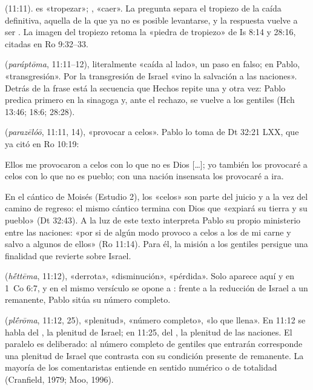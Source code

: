 \textbf{} (11:11).  es «tropezar»; , «caer». La pregunta separa el tropiezo de la caída definitiva, aquella de la que ya no es posible levantarse, y la respuesta vuelve a ser . La imagen del tropiezo retoma la «piedra de tropiezo» de Is 8:14 y 28:16, citadas en Ro 9:32--33.

\textbf{} (\emph{paráptōma}, 11:11--12), literalmente «caída al lado», un paso en falso; en Pablo, «transgresión». Por la transgresión de Israel «vino la salvación a las naciones». Detrás de la frase está la secuencia que Hechos repite una y otra vez: Pablo predica primero en la sinagoga y, ante el rechazo, se vuelve a los gentiles (Hch 13:46; 18:6; 28:28).

\textbf{} (\emph{parazēlóō}, 11:11, 14), «provocar a celos». Pablo lo toma de Dt 32:21 LXX, que ya citó en Ro 10:19:
\begin{cita}Ellos me provocaron a celos con lo que no es Dios [\ldots]; yo también los provocaré a celos con lo que no es pueblo; con una nación insensata los provocaré a ira.\end{cita}
En el cántico de Moisés (Estudio 2), los «celos» son parte del juicio y a la vez del camino de regreso: el mismo cántico termina con Dios que «expiará su tierra y su pueblo» (Dt 32:43). A la luz de este texto interpreta Pablo su propio ministerio entre las naciones: «por si de algún modo provoco a celos a los de mi carne y salvo a algunos de ellos» (Ro 11:14). Para él, la misión a los gentiles persigue una finalidad que revierte sobre Israel.

\textbf{} (\emph{hḗttēma}, 11:12), «derrota», «disminución», «pérdida». Solo aparece aquí y en 1~Co 6:7, y en el mismo versículo se opone a : frente a la reducción de Israel a un remanente, Pablo sitúa su número completo.

\textbf{} (\emph{plḗrōma}, 11:12, 25), «plenitud», «número completo», «lo que llena». En 11:12 se habla del , la plenitud de Israel; en 11:25, del , la plenitud de las naciones. El paralelo es deliberado: al número completo de gentiles que entrarán corresponde una plenitud de Israel que contrasta con su condición presente de remanente. La mayoría de los comentaristas entiende  en sentido numérico o de totalidad (Cranfield, 1979; Moo, 1996).

